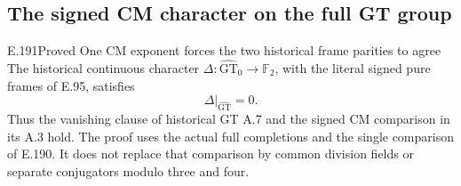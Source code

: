 \subsection{The signed CM character on the full GT group}

\begin{result}{E.191}{Proved}
{One CM exponent forces the two historical frame parities to agree}
The historical continuous character
\(\Delta:\widehat{\mathrm{GT}}_0\to\mathbb F_2\),
with the literal signed pure frames of E.95, satisfies
\[
                       \Delta|_{\widehat{\mathrm{GT}}}=0 .
\tag{E.191.1}
\]
Thus the vanishing clause of historical GT A.7 and
the signed CM comparison in its A.3 hold.  The proof
uses the actual full completions and the single
comparison of E.190.  It does not replace that
comparison by common division fields or separate
conjugators modulo three and four.
\end{result}

